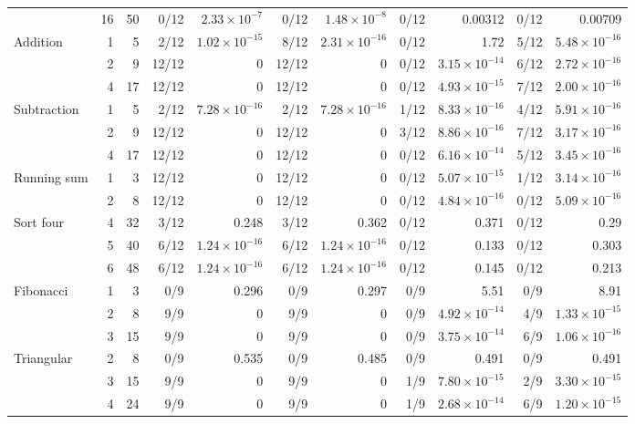 \begin{table}[htbp]
{\begin{tabular}{@{}lrr *{8}{r}@{}}
 & 16 & 50 & 0/12 & $2.33\!\times\!10^{-7}$ & 0/12 & $1.48\!\times\!10^{-8}$ & 0/12 & 0.00312 & 0/12 & 0.00709 \\
Addition & 1 & 5 & 2/12 & $1.02\!\times\!10^{-15}$ & 8/12 & $2.31\!\times\!10^{-16}$ & 0/12 & 1.72 & 5/12 & $5.48\!\times\!10^{-16}$ \\
 & 2 & 9 & 12/12 & 0 & 12/12 & 0 & 0/12 & $3.15\!\times\!10^{-14}$ & 6/12 & $2.72\!\times\!10^{-16}$ \\
 & 4 & 17 & 12/12 & 0 & 12/12 & 0 & 0/12 & $4.93\!\times\!10^{-15}$ & 7/12 & $2.00\!\times\!10^{-16}$ \\
Subtraction & 1 & 5 & 2/12 & $7.28\!\times\!10^{-16}$ & 2/12 & $7.28\!\times\!10^{-16}$ & 1/12 & $8.33\!\times\!10^{-16}$ & 4/12 & $5.91\!\times\!10^{-16}$ \\
 & 2 & 9 & 12/12 & 0 & 12/12 & 0 & 3/12 & $8.86\!\times\!10^{-16}$ & 7/12 & $3.17\!\times\!10^{-16}$ \\
 & 4 & 17 & 12/12 & 0 & 12/12 & 0 & 0/12 & $6.16\!\times\!10^{-14}$ & 5/12 & $3.45\!\times\!10^{-16}$ \\
Running sum & 1 & 3 & 12/12 & 0 & 12/12 & 0 & 0/12 & $5.07\!\times\!10^{-15}$ & 1/12 & $3.14\!\times\!10^{-16}$ \\
 & 2 & 8 & 12/12 & 0 & 12/12 & 0 & 0/12 & $4.84\!\times\!10^{-16}$ & 0/12 & $5.09\!\times\!10^{-16}$ \\
Sort four & 4 & 32 & 3/12 & 0.248 & 3/12 & 0.362 & 0/12 & 0.371 & 0/12 & 0.29 \\
 & 5 & 40 & 6/12 & $1.24\!\times\!10^{-16}$ & 6/12 & $1.24\!\times\!10^{-16}$ & 0/12 & 0.133 & 0/12 & 0.303 \\
 & 6 & 48 & 6/12 & $1.24\!\times\!10^{-16}$ & 6/12 & $1.24\!\times\!10^{-16}$ & 0/12 & 0.145 & 0/12 & 0.213 \\
Fibonacci & 1 & 3 & 0/9 & 0.296 & 0/9 & 0.297 & 0/9 & 5.51 & 0/9 & 8.91 \\
 & 2 & 8 & 9/9 & 0 & 9/9 & 0 & 0/9 & $4.92\!\times\!10^{-14}$ & 4/9 & $1.33\!\times\!10^{-15}$ \\
 & 3 & 15 & 9/9 & 0 & 9/9 & 0 & 0/9 & $3.75\!\times\!10^{-14}$ & 6/9 & $1.06\!\times\!10^{-16}$ \\
Triangular & 2 & 8 & 0/9 & 0.535 & 0/9 & 0.485 & 0/9 & 0.491 & 0/9 & 0.491 \\
 & 3 & 15 & 9/9 & 0 & 9/9 & 0 & 1/9 & $7.80\!\times\!10^{-15}$ & 2/9 & $3.30\!\times\!10^{-15}$ \\
 & 4 & 24 & 9/9 & 0 & 9/9 & 0 & 1/9 & $2.68\!\times\!10^{-14}$ & 6/9 & $1.20\!\times\!10^{-15}$ \\
\bottomrule
\end{tabular}}
\end{table}
